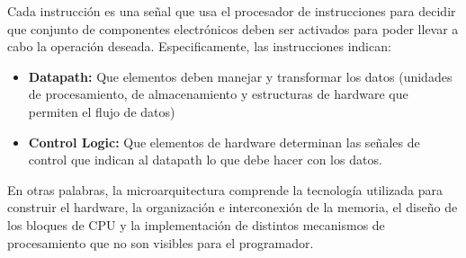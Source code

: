Cada instrucción es una señal que usa el procesador de instrucciones para decidir que conjunto de componentes electrónicos deben ser activados para poder llevar a cabo la operación deseada. Especificamente, las instrucciones indican: 

\begin{itemize}
	\item \textbf{Datapath:} Que elementos deben manejar y transformar los datos (unidades de procesamiento, de almacenamiento y estructuras de hardware que permiten el flujo de datos)
	\item \textbf{Control Logic:} Que elementos de hardware determinan las señales de control que indican al datapath lo que debe hacer con los datos.
\end{itemize}

En otras palabras, la microarquitectura comprende la tecnología utilizada para construir el hardware, la organización e interconexión de la memoria, el diseño de los bloques de CPU y la implementación de distintos mecanismos de procesamiento que no son visibles para el programador. 

%
%
%
%
%

